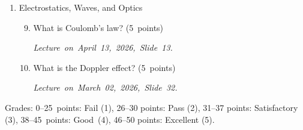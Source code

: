 \documentclass[a4paper,12pt]{letter}
\begin{document}
\begin{enumerate}[label=\Roman*.]
\begin{enumerate}[label=\arabic*.]
\smallskip
\textit{Lecture~on~March~16,~2026,~Slide~11.}

\item What is thermal expansion? What is linear expansion? What is volumetric expansion? \hfill (5~points)

\smallskip
\textit{Lecture~on~March~09,~2026,~Slides~5,~7.}

\item What is the ideal gas model? What is the ideal gas equation conceptually? \hfill (5~points)

\smallskip
\textit{Lecture~on~March~09,~2026,~Slides~20,~21.}

\item What is the Carnot cycle? \hfill (5~points)

\smallskip
\textit{Lecture~on~March~23,~2026,~Slide~9.}

\end{enumerate}
  

\item Electrostatics, Waves, and Optics

\begin{enumerate}[label=\arabic*.]
\setcounter{enumii}{8} %
  
\item What is Coulomb’s law? \hfill (5~points)

\smallskip
\textit{Lecture~on~April~13,~2026,~Slide~13.}
  
\item What is the Doppler effect? \hfill (5~points)

\smallskip
\textit{Lecture~on~March~02,~2026,~Slide~32.}

\end{enumerate}

\end{enumerate}


Grades: 0–25~points: Fail (1), 26–30 points: Pass (2), 31–37 points: Satisfactory (3), 38–45~points: Good~(4), 46–50 points: Excellent (5).


\vfill
\end{document}
